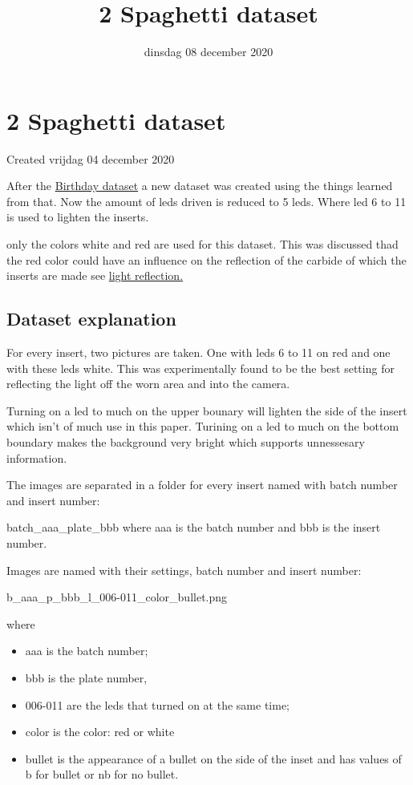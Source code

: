 \documentclass{scrartcl}
\title{2 Spaghetti dataset}
\date{dinsdag 08 december 2020}
\author{}
\begin{document}
\maketitle

		\section{2 Spaghetti dataset}

Created vrijdag 04 december 2020



After the \href{./1_Birthday_dataset.tex}{Birthday dataset} a new dataset was created using the things learned from that. Now the amount of leds driven is reduced to 5 leds. Where led 6 to 11 is used to lighten the inserts. 

only the colors white and red are used for this dataset. This was discussed thad the red color could have an influence on the reflection of the carbide of which the inserts are made see \href{../../../../Research/Light/Light_Reflection.tex}{light reflection.}



\subsection{Dataset explanation}

For every insert, two pictures are taken. One with leds 6 to 11 on red and one with these leds white. This was experimentally found to be the best setting for reflecting the light off the worn area and into the camera. 

Turning on a led to much on the upper bounary will lighten the side of the insert which isn't of much use in this paper. Turining on a led to much on the bottom boundary makes the background very bright which supports unnessesary information.



The images are separated in a folder for every insert named with batch number and insert number:

batch\_aaa\_plate\_bbb where aaa is the batch number and bbb is the insert number.

Images are named with their settings, batch number and insert number:

b\_aaa\_p\_bbb\_l\_006-011\_color\_bullet.png 

where 

\begin{itemize}
\item aaa is the batch number; 
\item bbb is the plate number, 
\item 006-011 are the leds that turned on at the same time; 
\item color is the color: red or white
\item bullet is the appearance of a bullet on the side of the inset and has values of b for bullet or nb for no bullet.
\end{itemize}
\end{document}
